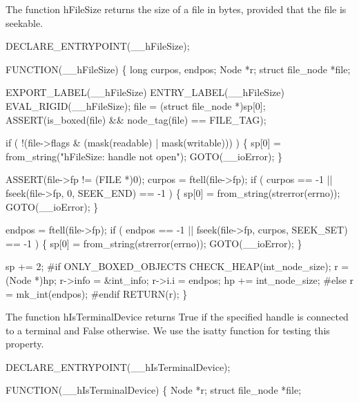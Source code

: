 \nwendcode{}\nwdocspar
The function {\Tt{}hFileSize\nwendquote} returns the size of a file in bytes,
provided that the file is seekable.

\nwenddocs{}\plusendmoddef\nwstartdeflinemarkup{}\nwenddeflinemarkup
DECLARE_ENTRYPOINT(__hFileSize);

FUNCTION(__hFileSize)
\{
    long             curpos, endpos;
    Node             *r;
    struct file_node *file;

    EXPORT_LABEL(__hFileSize)
 ENTRY_LABEL(__hFileSize)
    EVAL_RIGID(__hFileSize);
    file = (struct file_node *)sp[0];
    ASSERT(is_boxed(file) && node_tag(file) == FILE_TAG);

    if ( !(file->flags & (mask(readable) | mask(writable))) )
    \{
        sp[0] = from_string("hFileSize: handle not open");
        GOTO(__ioError);
    \}

    ASSERT(file->fp != (FILE *)0);
    curpos = ftell(file->fp);
    if ( curpos == -1 || fseek(file->fp, 0, SEEK_END) == -1 )
    \{
        sp[0] = from_string(strerror(errno));
        GOTO(__ioError);
    \}

    endpos = ftell(file->fp);
    if ( endpos == -1 || fseek(file->fp, curpos, SEEK_SET) == -1 )
    \{
        sp[0] = from_string(strerror(errno));
        GOTO(__ioError);
    \}

    sp += 2;
#if ONLY_BOXED_OBJECTS
    CHECK_HEAP(int_node_size);
    r       = (Node *)hp;
    r->info = &int_info;
    r->i.i  = endpos;
    hp     += int_node_size;
#else
    r = mk_int(endpos);
#endif
    RETURN(r);
\}

\nwendcode{}\nwdocspar
The function {\Tt{}hIsTerminalDevice\nwendquote} returns {\Tt{}True\nwendquote} if the specified
handle is connected to a terminal and {\Tt{}False\nwendquote} otherwise. We use the
{\Tt{}isatty\nwendquote} function for testing this property.

\nwenddocs{}\plusendmoddef\nwstartdeflinemarkup{}\nwenddeflinemarkup
DECLARE_ENTRYPOINT(__hIsTerminalDevice);

FUNCTION(__hIsTerminalDevice)
\{
    Node             *r;
    struct file_node *file;

